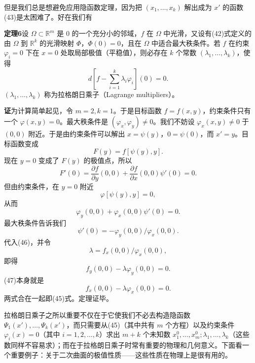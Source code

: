 但是我们总是想避免应用隐函数定理，因为把 $(x_1,\ldots,x_k)$ 解出成为 $x'$ 的函数(43)是太困难了。好在我们有

\noindent\textbf{定理6}\quad 设 $\Omega\subset\mathbb R^m$ 是 $0$ 的一个充分小的邻域，$f$ 在 $\Omega$ 中光滑，又设有(42)式定义的由 $\Omega$ 到 $\mathbb R^k$ 的光滑映射 $\Phi$，$\Phi(0)=0$，且在 $\Omega$ 中适合最大秩条件。若 $f$ 在约束 $\varphi_i=0$ 下在 $x=0$ 处取局部极值（平稳值），则必存在 $k$ 个常数 $(\lambda_1,\ldots,\lambda_k)$，使得
\begin{equation}
 d\left[f-\sum_{i=1}^{k}\lambda_i\varphi_i\right](0)=0.
 \tag{45}
\end{equation}
$(\lambda_1,\ldots,\lambda_k)$ 称为拉格朗日乘子（Lagrange multipliers）。

\noindent\textbf{证}\quad 为计算简单起见，令 $m=2,k=1$。于是目标函数 $f=f(x,y)$，约束条件只有一个 $\varphi(x,y)=0$。最大秩条件是 $(\varphi_x,\varphi_y)\ne0$。我们不妨设 $\varphi_x(x,y)\ne0$ 于 $(0,0)$ 附近。于是由约束条件可以解出 $x=\psi(y)$，$0=\psi(0)$，而 $x'=y$。目标函数变成
\[
 F(y)=f[\psi(y),y].
\]
现在 $y=0$ 变成了 $F(y)$ 的极值点，所以
\begin{equation}
 F'(0)=\frac{\partial f}{\partial y}(0,0)
 +\frac{\partial f}{\partial x}(0,0)\psi'(0)=0.
 \tag{46}
\end{equation}
但由约束条件，在 $y=0$ 附近
\[
 \varphi[\psi(y),y]=0,
\]
从而
\[
 \varphi_y(0,0)+\varphi_x(0,0)\psi'(0)=0.
\]
最大秩条件告诉我们
\[
 \psi'(0)=-\varphi_y(0,0)/\varphi_x(0,0).
\]
代入(46)，并令
\begin{equation}
 \lambda=f_x(0,0)/\varphi_x(0,0),
 \tag{47}
\end{equation}
即得
\[
 f_y(0,0)-\lambda\varphi_y(0,0)=0.
\]
(47)本身就是
\[
 f_x(0,0)-\lambda\varphi_x(0,0)=0.
\]
两式合在一起即(45)式。定理证毕。

拉格朗日乘子之所以重要不仅在于它使我们不必去构造隐函数 \(\Psi_1(x'),\ldots,\allowbreak\Psi_k(x')\)，而只需要从(45)（其中共有 $m$ 个方程）以及约束条件 $\varphi_i(x)=0$（其中 $i=1,2,\ldots,k$）求出 $m+k$ 个未知数 \(x_1^0,\ldots,\allowbreak x_m^0;\lambda_1,\ldots,\allowbreak\lambda_k\)（这些数同样不容易求）；而在于拉格朗日乘子时常有重要的物理和几何意义。下面看一个重要例子：关于二次曲面的极值性质——这些性质在物理上是很有用的。

